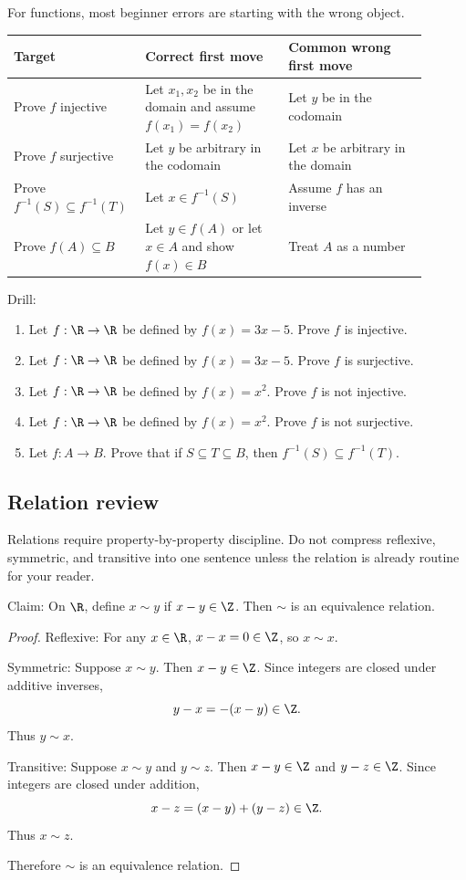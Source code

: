 For functions, most beginner errors are starting with the wrong object.

\begin{longtable}{p{0.25\linewidth}p{0.33\linewidth}p{0.32\linewidth}}
\toprule
Target & Correct first move & Common wrong first move \\
\midrule
Prove $f$ injective & Let $x_1,x_2$ be in the domain and assume $f(x_1)=f(x_2)$ & Let $y$ be in the codomain \\
Prove $f$ surjective & Let $y$ be arbitrary in the codomain & Let $x$ be arbitrary in the domain \\
Prove $f^{-1}(S)\subseteq f^{-1}(T)$ & Let $x\in f^{-1}(S)$ & Assume $f$ has an inverse \\
Prove $f(A)\subseteq B$ & Let $y\in f(A)$ or let $x\in A$ and show $f(x)\in B$ & Treat $A$ as a number \\
\bottomrule
\end{longtable}

Drill:

\begin{enumerate}
\item Let $f:\R\to\R$ be defined by $f(x)=3x-5$. Prove $f$ is injective.
\item Let $f:\R\to\R$ be defined by $f(x)=3x-5$. Prove $f$ is surjective.
\item Let $f:\R\to\R$ be defined by $f(x)=x^2$. Prove $f$ is not injective.
\item Let $f:\R\to\R$ be defined by $f(x)=x^2$. Prove $f$ is not surjective.
\item Let $f:A\to B$. Prove that if $S\subseteq T\subseteq B$, then $f^{-1}(S)\subseteq f^{-1}(T)$.
\end{enumerate}

\subsection{Relation review}

Relations require property-by-property discipline. Do not compress reflexive, symmetric, and transitive into one sentence unless the relation is already routine for your reader.

Claim: On $\R$, define $x\sim y$ if $x-y\in\Z$. Then $\sim$ is an equivalence relation.

\begin{proof}
Reflexive: For any $x\in\R$, $x-x=0\in\Z$, so $x\sim x$.

Symmetric: Suppose $x\sim y$. Then $x-y\in\Z$. Since integers are closed under additive inverses,
\[
y-x=-(x-y)\in\Z.
\]
Thus $y\sim x$.

Transitive: Suppose $x\sim y$ and $y\sim z$. Then $x-y\in\Z$ and $y-z\in\Z$. Since integers are closed under addition,
\[
x-z=(x-y)+(y-z)\in\Z.
\]
Thus $x\sim z$.

Therefore $\sim$ is an equivalence relation.
\end{proof}

